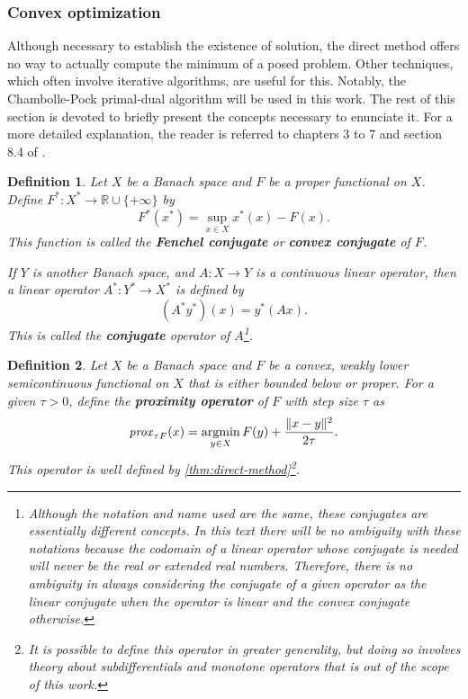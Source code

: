 \documentclass[twocolumn,twoside,a4paper,10pt]{IEEEtran}
\newtheorem{definition}{Definition}
\DeclareMathOperator*{\argmin}{\operatorname*{argmin}}
\DeclareMathOperator*{\argmin}{arg\,min}
\begin{document}
\subsubsection{Convex optimization} Although necessary to establish the existence of solution, the direct method offers no way to actually compute the minimum of a posed problem. Other techniques, which often involve iterative algorithms, are useful for this. Notably, the Chambolle-Pock primal-dual algorithm will be used in this work. The rest of this section is devoted to briefly present the concepts necessary to enunciate it. For a more detailed explanation, the reader is referred to chapters 3 to 7 and section 8.4 of \cite{clason2024introductionnonsmoothanalysisoptimization}.

\begin{definition}
  Let \(X\) be a Banach space and \(F\) be a proper functional on \(X\). Define \(F^*\colon X^*\to\mathbb{R}\cup\{+\infty\}\) by
  \[
    F^*(x^*) = \sup_{x\in X}x^*(x) - F(x)
  .\]
This function is called the \textbf{Fenchel conjugate} or \textbf{convex conjugate} of \(F\).

  If \(Y\) is another Banach space, and \(A\colon X\to Y\) is a continuous linear operator, then a linear operator \(A^*\colon Y^*\to X^*\) is defined by
  \[
     (A^*y^*)(x) = y^*(Ax)
  .\]
This is called the \textbf{conjugate} operator of \(A\)\footnote{Although the notation and name used are the same, these conjugates are essentially different concepts. In this text there will be no ambiguity with these notations because the codomain of a linear operator whose conjugate is needed will never be the real or extended real numbers. Therefore, there is no ambiguity in always considering the conjugate of a given operator as the linear conjugate when the operator is linear and the convex conjugate otherwise.}.
\end{definition}

\begin{definition}
  Let \(X\) be a Banach space and \(F\) be a convex, weakly lower semicontinuous functional on \(X\) that is either bounded below or proper. For a given \(\tau>0\), define the \textbf{proximity operator} of \(F\) with step size \(\tau\) as
  \[
    \text{\emph{prox}}_{\tau F}(x) = \argmin_{y\in X}F(y) + \frac{\|x-y\|^2}{2\tau}
  .\]
This operator is well defined by \cref{thm:direct-method}\footnote{It is possible to define this operator in greater generality, but doing so involves theory about subdifferentials and monotone operators that is out of the scope of this work.}.
\end{definition}
\end{document}
